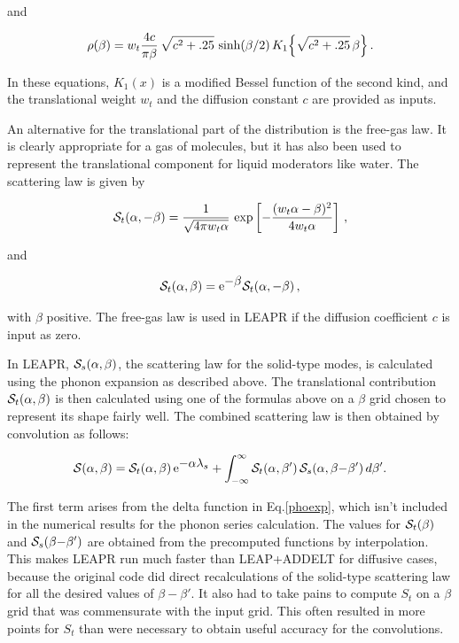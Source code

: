 \noindent
and

\begin{equation}
   \rho(\beta)=w_t \frac{4 c}{\pi\beta}\,\sqrt{c^2+.25}\,
      \sinh(\beta/2)\,K_1\Bigl\{\sqrt{c^2+.25}\,\beta\Bigr\}\,.
\end{equation}
\vspace{0.5 pt}

\noindent
In these equations, $K_1(x)$ is a modified Bessel function of the
second kind, and the translational weight $w_t$ and the
diffusion constant $c$ are provided as inputs.

An alternative for the translational part of the distribution is
the free-gas law.  It is clearly appropriate for
a gas of molecules, but it has also been used to represent the
translational component for liquid moderators like water\cite{GAreport}.
The scattering law is given by

\begin{equation}
   {\cal S}_t(\alpha,-\beta)=\frac{1}{\sqrt{4\pi w_t\alpha}}
       \,\exp\left[-\frac{(w_t\alpha-\beta)^2}{4w_t\alpha}\right]\,,
\end{equation}

\noindent
and

\begin{equation}
   {\cal S}_t(\alpha,\beta)={\rm e}^{\textstyle -\beta}{\cal S}_t(\alpha,-\beta)\,,
\end{equation}

\noindent
with $\beta$ positive.  The free-gas law is used in LEAPR if the
diffusion coefficient $c$ is input as zero.

In LEAPR, ${\cal S}_s(\alpha,\beta)$, the scattering law for the solid-type
modes, is calculated using the phonon expansion as described above.
The translational contribution ${\cal S}_t(\alpha,\beta)$ is then calculated
using one of the formulas above on a $\beta$ grid chosen to represent its
shape fairly well.  The combined scattering law is then obtained
by convolution as follows:

\begin{equation}
   {\cal S}(\alpha,\beta)={\cal S}_t(\alpha,\beta)\,{\rm e}^{\textstyle -\alpha\lambda_s}
     +\int_{-\infty}^\infty {\cal S}_t(\alpha,\beta')\,
      {\cal S}_s(\alpha,\beta{-}\beta')\,d\beta'.
\end{equation}

\noindent
The first term arises from the delta function in Eq.\ref{phoexp},
which isn't included in the numerical results for the phonon series
calculation.  The values for ${\cal S}_t(\beta)$ and
${\cal S}_s(\beta{-}\beta')$ are obtained from
the precomputed functions by interpolation.  This makes LEAPR run
much faster than LEAP+ADDELT for diffusive cases, because the original
code did direct recalculations of the solid-type scattering law for
all the desired values of $\beta{-}\beta'$.  It also had to take pains
to compute $S_t$ on a $\beta$ grid that was commensurate with the
input grid.  This often resulted in more points for $S_t$ than were
necessary to obtain useful accuracy for the convolutions.

